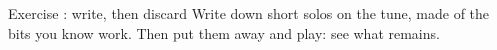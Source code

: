 \begin{study}{Exercise \theexercise: write, then discard}
Write down short solos on the tune, made of the bits you know work.
Then put them away and play: see what remains.
\end{study}
